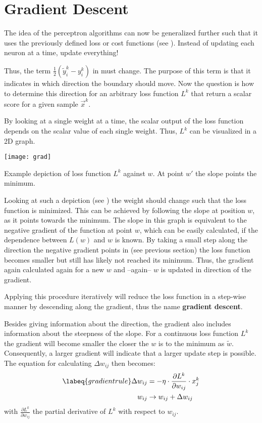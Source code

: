 \section{Gradient Descent}
The idea of the perceptron algorithms can now be generalized further such that it uses the previously defined loss or cost functions (see ).
Instead of updating each neuron at a time, update everything!

Thus, the term $\frac{1}{2}(\tilde{y}^k_i - y^k_i)$ in  must change.
The purpose of this term is that it indicates in which direction the boundary should move.
Now the question is how to determine this direction for an arbitrary loss function $L^k$ that return a scalar score for a given sample $\vec{x}^k$.

By looking at a single weight at a time, the scalar output of the loss function depends on the scalar value of each single weight.
Thus, $L^k$ can be visualized in a 2D graph.
\begin{marginfigure}
    \texttt{[image: grad]}
    \caption{Example depiction of loss function $L^k$ against $w$. At point $w'$ the slope points the minimum.}
\end{marginfigure}
Looking at such a depiction (see ) the weight should change such that the loss function is minimized.
This can be achieved by following the slope at position $w$, as it points towards the minimum.
The slope in this graph is equivalent to the negative gradient of the function at point $w$, which can be easily calculated, if the dependence between $L(w)$ and $w$ is known.
By taking a small step along the direction the negative gradient points in (see previous section) the loss function becomes smaller but still has likely not reached its minimum.
Thus, the gradient again calculated again for a new $w$ and --again-- $w$ is updated in direction of the gradient.

Applying this procedure iteratively will reduce the loss function in a step-wise manner by descending along the gradient, thus the name \textbf{gradient descent}.

Besides giving information about the direction, the gradient also includes information about the steepness of the slope.
For a continuous loss function $L^k$ the gradient will become smaller the closer the $w$ is to the minimum as $\tilde{w}$.
Consequently, a larger gradient will indicate that a larger update step is possible.\\
The equation for calculating $\Delta w_{ij}$ then becomes:
\begin{align}
    \labeq{gradientrule}
    \Delta w_{ij} & = - \eta \cdot \frac{\partial L^k}{\partial w_{ij}} \cdot x^k_j \\
    w_{ij} & \rightarrow w_{ij} + \Delta w_{ij}
\end{align}
with $\frac{\partial L^k}{\partial w_{ij}}$ the partial derivative of $L^k$ with respect to $w_{ij}$.

